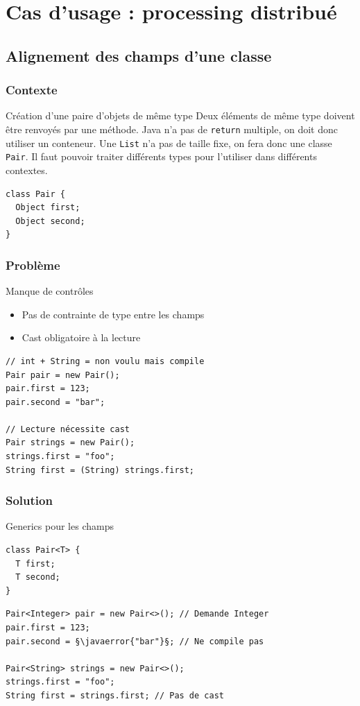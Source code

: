 \documentclass[draft]{beamer}
\makeatletter
\def\uwave{\bgroup\markoverwith{\lower4\p@\hbox{\sixly \textcolor{errorcolor}{\char58}}}\ULon}
\newcommand{\javaerror}[1]{%
  \uwave{#1}%
}
\makeatother
\begin{document}
\section{Cas d'usage : processing distribué}

\subsection{Alignement des champs d'une classe}

\begin{frame}[fragile]
\frametitle{Contexte}
\begin{block}{Création d'une paire d'objets de même type}
 Deux éléments de même type doivent être renvoyés par une méthode.
 Java n'a pas de \lstinline{return} multiple, on doit donc utiliser un conteneur.
 Une \lstinline{List} n'a pas de taille fixe, on fera donc une classe \lstinline{Pair}.
 Il faut pouvoir traiter différents types pour l'utiliser dans différents contextes.
\end{block}
\begin{lstlisting}
class Pair {
  Object first;
  Object second;
}
\end{lstlisting}
\end{frame}

\begin{frame}[fragile]
\frametitle{Problème}
\begin{alertblock}{Manque de contrôles}
 \begin{itemize}
  \item Pas de contrainte de type entre les champs
  \item Cast obligatoire à la lecture
 \end{itemize}
\end{alertblock}
\begin{lstlisting}
// int + String = non voulu mais compile
Pair pair = new Pair();
pair.first = 123;
pair.second = "bar";

// Lecture nécessite cast
Pair strings = new Pair();
strings.first = "foo";
String first = (String) strings.first;
\end{lstlisting}
\end{frame}

\begin{frame}[fragile]
\frametitle{Solution}
\begin{exampleblock}{Generics pour les champs}
\begin{lstlisting}[numbers=none]
class Pair<T> {
  T first;
  T second;
}
\end{lstlisting}
\end{exampleblock}
\begin{lstlisting}
Pair<Integer> pair = new Pair<>(); // Demande Integer
pair.first = 123;
pair.second = §\javaerror{"bar"}§; // Ne compile pas

Pair<String> strings = new Pair<>();
strings.first = "foo";
String first = strings.first; // Pas de cast
\end{lstlisting}
\end{frame}
\end{document}
